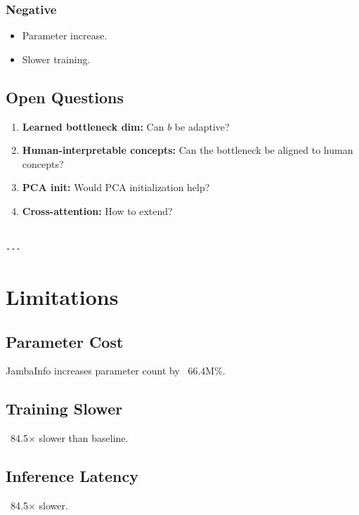 \subsubsection{Negative}
\begin{itemize}
\item Parameter increase.
\item Slower training.

\end{itemize}
\subsection{Open Questions}

\begin{enumerate}
\item \textbf{Learned bottleneck dim:} Can $b$ be adaptive?
\item \textbf{Human-interpretable concepts:} Can the bottleneck be aligned to human concepts?
\item \textbf{PCA init:} Would PCA initialization help?
\item \textbf{Cross-attention:} How to extend?
\end{enumerate}
\begin{lstlisting}

---
\end{lstlisting}

\section{Limitations}

\subsection{Parameter Cost}

JambaInfo increases parameter count by ~66.4M\%.

\subsection{Training Slower}

~84.5$\times$ slower than baseline.

\subsection{Inference Latency}

~84.5$\times$ slower.

